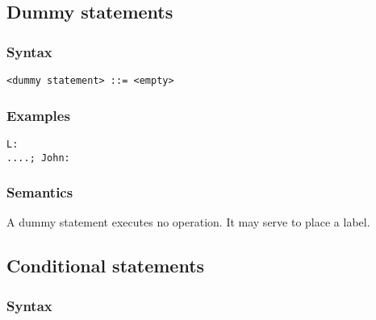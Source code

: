 \documentclass[a4paper,11pt]{article}
\begin{document}
\subsection{Dummy statements}
\label{LblDummyStatements}


\subsubsection{Syntax}
\label{LblDummyStatementsSyntax}

\begin{flushleft}
\vspace{0.2em}\texttt{<dummy statement> ::= <empty>}\\
\end{flushleft}


\subsubsection{Examples}

\begin{flushleft}
\texttt{L:\\
 ....; John: }\\
\end{flushleft}


\subsubsection{Semantics}
\label{LblDummyStatementsSemantics}

A dummy statement executes no operation.  It may serve to place a
label.




\subsection{Conditional statements}


\subsubsection{Syntax}
\label{LblConditionalStatementsSyntax}
\end{document}
